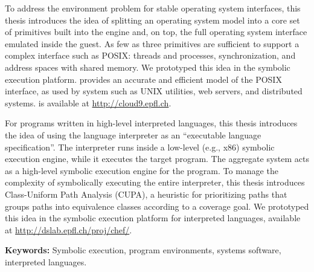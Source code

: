To address the environment problem for stable operating system interfaces, this thesis introduces the idea of splitting an operating system model into a core set of primitives built into the engine and, on top, the full operating system interface emulated inside the guest.
%
As few as three primitives are sufficient to support a complex interface such as POSIX: threads and processes, synchronization, and address spaces with shared memory.
%
We prototyped this idea in the \emph{\cnine} symbolic execution platform. \cnine provides an accurate and efficient model of the POSIX interface, as used by system such as UNIX utilities, web servers, and distributed systems.
%
\cnine is available at {\url{http://cloud9.epfl.ch}}.

For programs written in high-level interpreted languages, this thesis introduces the idea of using the language interpreter as an ``executable language specification''.  The interpreter runs inside a low-level (e.g., x86) symbolic execution engine, while it executes the target program.  The aggregate system acts as a high-level symbolic execution engine for the program.
%
To manage the complexity of symbolically executing the entire interpreter, this thesis introduces Class-Uniform Path Analysis (CUPA), a heuristic for prioritizing paths that groups paths into equivalence classes according to a coverage goal.
%
We prototyped this idea in the \emph{\chef} symbolic execution platform for interpreted languages, available at {\url{http://dslab.epfl.ch/proj/chef/}}.

\noindent \textbf{Keywords:} Symbolic execution, program environments, systems software, interpreted languages.


